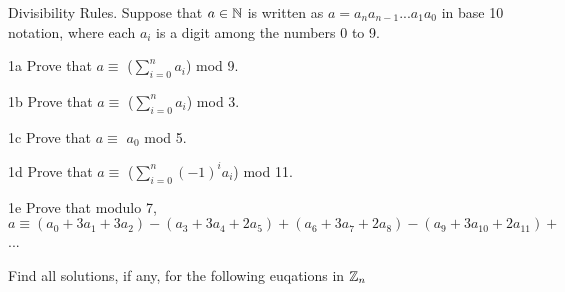 \begin{question}{1}
Divisibility Rules. Suppose that $a \in \mathbb{N}$ is written as $a = a_na_{n-1}...a_1a_0$ in base 10 notation, where each $a_{i}$ is a digit among the numbers 0 to 9.
\end{question}


\begin{question}{1a}
Prove that $a\equiv$ ($\displaystyle\sum\limits_{i=0}^n a_i$) mod 9.
\end{question}

\begin{question}{1b}
Prove that $a\equiv$ ($\displaystyle\sum\limits_{i=0}^n a_i$) mod 3.
\end{question}

\begin{question}{1c}
Prove that $a\equiv$ $a_0$ mod 5.

\end{question}

\begin{question}{1d}
Prove that $a\equiv$ ($\displaystyle\sum\limits_{i=0}^n (-1)^i a_i$) mod 11.
\end{question}

\begin{question}{1e}
Prove that modulo 7, $a \equiv (a_0 + 3a_1 + 3a_2)-(a_3+3a_4+2a_5)+(a_6+3a_7+2a_8)-(a_9+3a_{10}+2a_{11})+$...
\end{question}



\begin{question}{2}
Find all solutions, if any, for the following euqations in $\mathbb{Z}_n$
\end{question}




%
%



